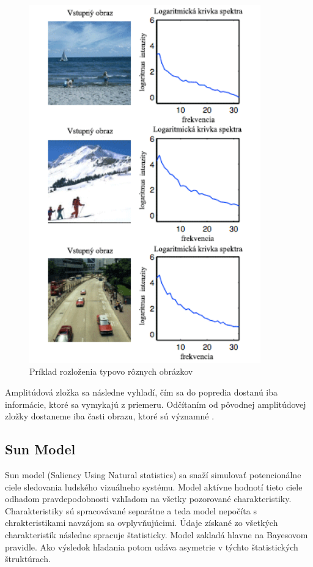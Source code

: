 \begin{figure}[H]
  \centering
  \includegraphics[width=10cm]{pics/spectral-img.png}
  \caption{Príklad rozloženia typovo rôznych obrázkov\cite{spectral-rezidual}}\label{wrap-fig:2}
\end{figure}
\vspace{10mm}

Amplitúdová zložka sa následne vyhladí, čím sa do popredia dostanú iba informácie, ktoré sa vymykajú z priemeru.
Odčítaním od pôvodnej amplitúdovej zložky dostaneme iba časti obrazu, ktoré sú významné \cite{spectral-rezidual}.
\subsection{Sun Model}
Sun model (Saliency Using Natural statistics) sa snaží simulovať potencionálne ciele sledovania ludského vizuálneho systému.
Model aktívne hodnotí tieto ciele odhadom pravdepodobnosti vzhľadom na všetky pozorované charakteristiky.
Charakteristiky sú spracovávané separátne a teda model nepočíta s chrakteristikami navzájom sa ovplyvňujúcimi.
Údaje získané zo všetkých charakteristík následne spracuje štatisticky.
Model zakladá hlavne na Bayesovom pravidle.
Ako výsledok hľadania potom udáva asymetrie v týchto štatistických štruktúrach\cite{sun-1}.
